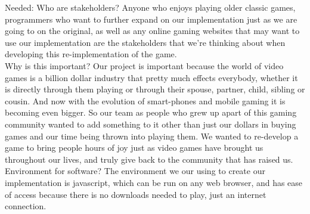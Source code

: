 \documentclass{article}
\begin{document}
Needed:
Who are stakeholders? Anyone who enjoys playing older classic games, programmers who want to further expand on our implementation just as we are going to on the original, as well as any online gaming websites that may want to use our implementation are the stakeholders that we're thinking about when developing this re-implementation of the game. \\
Why is this important? Our project is important because the world of video games is a billion dollar industry that pretty much effects everybody, whether it is directly through them playing or through their spouse, partner, child, sibling or cousin. And now with the evolution of smart-phones and mobile gaming it is becoming even bigger. So our team as people who grew up apart of this gaming community wanted to add something to it other than just our dollars in buying games and our time being thrown into playing them. We wanted to re-develop a game to bring people hours of joy just as video games have brought us throughout our lives, and truly give back to the community that has raised us.\\
Environment for software? The environment we our using to create our implementation is javascript, which can be run on any web browser, and has ease of access because there is no downloads needed to play, just an internet connection.





\end{document}
